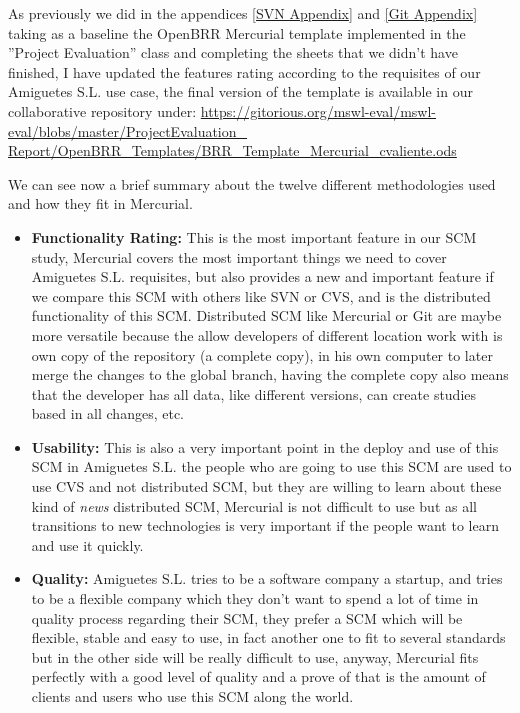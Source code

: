 \documentclass[a4paper,10pt]{article}
\begin{document}
As previously we did in the appendices \ref{SVN Appendix} and \ref{Git Appendix}
taking as a baseline the OpenBRR Mercurial template implemented in the ”Project
Evaluation” class and completing the sheets that we didn't have finished, I have
updated the features rating according to the requisites of our Amiguetes S.L.
use case, the final version of the template is available in our collaborative
repository under:
\url{https://gitorious.org/mswl-eval/mswl-eval/blobs/master/ProjectEvaluation_
Report/OpenBRR_Templates/BRR_Template_Mercurial_cvaliente.ods}

We can see now a brief summary about the twelve different methodologies used
and how they fit in Mercurial.

\begin{itemize}
\item \textbf{Functionality Rating:}
This is the most important feature in our SCM study, Mercurial covers the most
important 
things we need to cover Amiguetes S.L. requisites, but also provides a new and 
important feature if we compare this SCM with others like SVN or CVS, and is the
distributed functionality of this SCM.
Distributed SCM like Mercurial or Git are maybe more versatile because the allow
developers of different location work with is own copy of the repository (a
complete copy), 
in his own computer to later merge the changes to the global branch, having the
complete
copy also means that the developer has all data, like different versions, can
create
studies based in all changes, etc.

\item \textbf{Usability:}
This is also a very important point in the deploy and use of this SCM in
Amiguetes S.L.
the people who are going to use this SCM are used to use CVS and not distributed
SCM, but they are willing
to learn about these kind of \textit{news} distributed SCM, Mercurial is not
difficult to use
but as all transitions to new technologies is very important if the people want
to learn and use it quickly.

\item \textbf{Quality:}
Amiguetes S.L. tries to be a software company a startup, and tries to be a
flexible company which
they don't want to spend a lot of time in quality process regarding their SCM,
they prefer a SCM which
will be flexible, stable and easy to use, in fact another one to fit to several
standards but in the other
side will be really difficult to use, anyway, Mercurial fits perfectly with a
good level of quality and a prove of that
is the amount of clients and users who use this SCM along the world.


\end{itemize}
\end{document}
